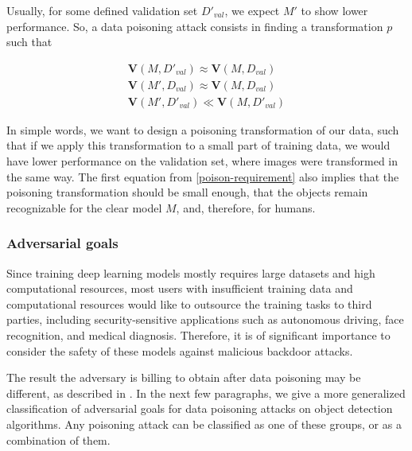 \documentclass[14pt,a4paper]{extarticle}
\newcounter{e}
\numberwithin{equation}{section}
\numberwithin{figure}{section}
\begin{document}
Usually, for some defined validation set $D'_{val}$, we expect $M'$ to show lower performance. So, a data poisoning attack consists in finding a transformation $p$ such that

\begin{equation}
\label{poison-requirement}
    \begin{gathered}
        \textbf{V}(M, D'_{val}) \approx \textbf{V}(M, D_{val}) \\
        \textbf{V}(M', D_{val}) \approx \textbf{V}(M, D_{val}) \\
        \textbf{V}(M', D'_{val}) \ll \textbf{V}(M, D'_{val})
    \end{gathered}
\end{equation}

In simple words, we want to design a poisoning transformation of our data, such that if we apply this transformation to a small part of training data, we would have lower performance on the validation set, where images were transformed in the same way.
The first equation from \ref{poison-requirement} also implies that the poisoning transformation should be small enough, that the objects remain recognizable for the clear model $M$, and, therefore, for humans. 

\subsubsection{Adversarial goals}

Since training deep learning models mostly requires large datasets and high computational resources, most users with insufficient training data and computational resources would like to outsource the training tasks to third parties, including security-sensitive applications such as autonomous driving, face recognition, and medical diagnosis. Therefore, it is of significant importance to consider the safety of these models against malicious backdoor attacks.

The result the adversary is billing to obtain after data poisoning may be different, as described in \cite{baddet}. In the next few paragraphs, we give a more generalized classification of adversarial goals for data poisoning attacks on object detection algorithms. Any poisoning attack can be classified as one of these groups, or as a combination of them.
\end{document}
